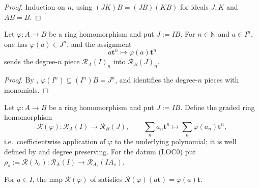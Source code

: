 \begin{proof}
  \leanok
  Induction on $n$, using $(JK)B=(JB)(KB)$ for ideals $J,K$ and
  $AB=B$.
\end{proof}

\begin{lemma}
  \label{lemma:nagata-localization-rees-piece}
  \leanok

  Let $\varphi\colon A\to B$ be a ring homomorphism and put
  $J:=IB$.  For $n\in\mathbb N$ and $a\in I^n$, one has
  $\varphi(a)\in J^n$, and the assignment
  \[
    a\mathbf t^n\longmapsto\varphi(a)\mathbf t^n
  \]
  sends the degree-$n$ piece $\mathcal R_A(I)_n$ into
  $\mathcal R_B(J)_n$.
\end{lemma}

\begin{proof}
  \leanok
  By ,
  $\varphi(I^n)\subseteq(I^n)B=J^n$, and
   identifies the degree-$n$
  pieces with monomials.
\end{proof}

\begin{definition}
  \label{def:nagata-rees-localization-map}
  \leanok

  Let $\varphi\colon A\to B$ be a ring homomorphism and put $J:=IB$.
  Define the graded ring homomorphism
  \[
    \mathcal R(\varphi)\colon\mathcal R_A(I)\longrightarrow\mathcal R_B(J),
    \qquad
    \textstyle\sum_n a_n\mathbf t^n\longmapsto\sum_n\varphi(a_n)\mathbf t^n,
  \]
  i.e.\ coefficientwise application of $\varphi$ to the underlying
  polynomial; it is well defined by
   and degree preserving.  For
  the datum (LOC0) put $\rho_s:=\mathcal R(\lambda_s)\colon
  \mathcal R_A(I)\to\mathcal R_{A_s}(IA_s)$.
\end{definition}

\begin{lemma}
  \label{lemma:nagata-rees-localization-degree-one}
  \leanok

  For $a\in I$, the map $\mathcal R(\varphi)$ of
   satisfies
  $\mathcal R(\varphi)(a\mathbf t)=\varphi(a)\mathbf t$.
\end{lemma}

